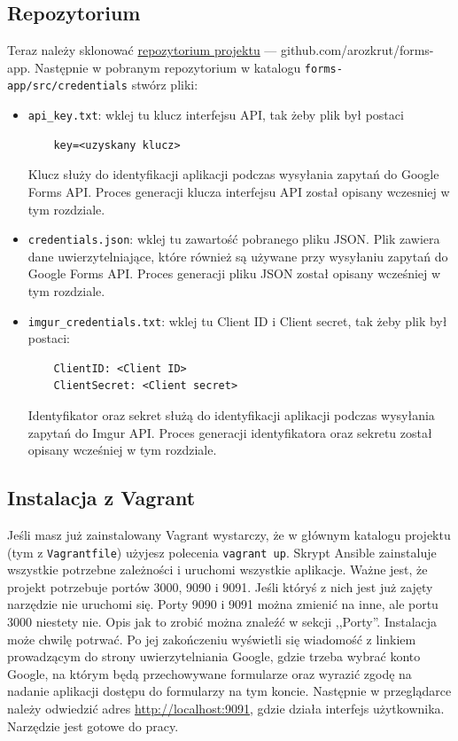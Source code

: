 \subsection{Repozytorium}
Teraz należy sklonować \href{https://github.com/arozkrut/forms-apps}
{repozytorium projektu} --- github.com/arozkrut/forms-app.
Następnie w pobranym repozytorium w katalogu \texttt{forms-app/src/credentials}
stwórz pliki:
\begin{itemize}
  \item \texttt{api\_key.txt}: wklej tu klucz interfejsu API, tak żeby plik był
  postaci
  \begin{verbatim}
    key=<uzyskany klucz>
  \end{verbatim}
  Klucz służy do identyfikacji aplikacji podczas wysyłania zapytań do Google Forms API. 
  Proces generacji klucza interfejsu API został opisany wczesniej w tym rozdziale.
  \item \texttt{credentials.json}: wklej tu zawartość pobranego pliku JSON.
  Plik zawiera dane uwierzytelniające, które również są używane przy wysyłaniu
  zapytań do Google Forms API. 
  Proces generacji pliku JSON został opisany wcześniej w tym rozdziale.
  \item \texttt{imgur\_credentials.txt}: wklej tu Client ID i Client secret,
  tak żeby plik był postaci:
  \begin{verbatim}
    ClientID: <Client ID>
    ClientSecret: <Client secret>
  \end{verbatim}
  Identyfikator oraz sekret służą do identyfikacji aplikacji podczas wysyłania zapytań
  do Imgur API. Proces generacji identyfikatora oraz sekretu został opisany wcześniej
  w tym rozdziale.
\end{itemize}

\subsection{Instalacja z Vagrant}
Jeśli masz już zainstalowany Vagrant wystarczy, że w głównym katalogu projektu
(tym z \texttt{Vagrantfile}) użyjesz polecenia \texttt{vagrant up}. Skrypt
Ansible zainstaluje wszystkie potrzebne zależności i uruchomi wszystkie
aplikacje. Ważne jest, że projekt potrzebuje portów 3000, 9090 i 9091.
Jeśli któryś z nich jest już zajęty narzędzie nie uruchomi się. Porty 9090 i 9091
można zmienić na inne, ale portu 3000 niestety nie. Opis jak to zrobić można znaleźć
w sekcji ,,Porty''. Instalacja może
chwilę potrwać. Po jej zakończeniu wyświetli się wiadomość z linkiem prowadzącym
do strony uwierzytelniania Google, gdzie trzeba wybrać konto Google, na którym
będą przechowywane formularze oraz wyrazić zgodę na nadanie aplikacji dostępu do
formularzy na tym koncie. Następnie w przeglądarce należy odwiedzić adres
\href{http://localhost:9091}{http://localhost:9091}, gdzie działa interfejs
użytkownika. Narzędzie jest gotowe do pracy.

